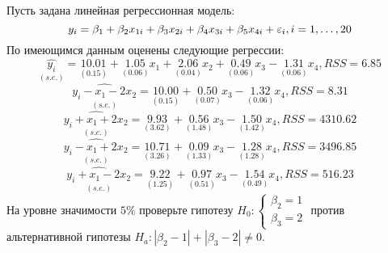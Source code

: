 \documentclass[pdftex,11pt,openany]{book}\usepackage[]{graphicx}\usepackage[]{color}
\begin{document}
\begin{problem}
 Пусть задана линейная регрессионная модель:
\[
y_i = \beta_1 + \beta_2 x_{1i} + \beta_3 x_{2i} + \beta_4 x_{3i} + \beta_5 x_{4i} + \varepsilon_i, i = 1, \dots, 20
\]
По имеющимся данным оценены следующие регрессии:
\[
\underset{(s.e.)}{\hat{y_i}} = \underset{(0.15)}{10.01} + \underset{(0.06)}{1.05}x_1 + \underset{(0.04)}{2.06}x_2 + \underset{(0.06)}{0.49}x_3 - \underset{(0.06)}{1.31}x_4, RSS = 6.85
\]
\[
\underset{(s.e.)}{\widehat{y_i- x_1 - 2x_2}} = \underset{(0.15)}{10.00} + \underset{(0.07)}{0.50}x_3 - \underset{(0.06)}{1.32}x_4, RSS = 8.31 
\]
\[
\underset{(s.e.)}{\widehat{y_i + x_1 + 2x_2}} = \underset{(3.62)}{9.93} + \underset{(1.48)}{0.56}x_3 - \underset{(1.42)}{1.50}x_4, RSS = 4310.62 
\]
\[
\underset{(s.e.)}{\widehat{y_i - x_1 + 2x_2}} = \underset{(3.26)}{10.71} + \underset{(1.33)}{0.09}x_3 - \underset{(1.28)}{1.28}x_4, RSS = 3496.85
\]
\[
\underset{(s.e.)}{\widehat{y_i + x_1 - 2x_2}} = \underset{(1.25)}{9.22} + \underset{(0.51)}{0.97}x_3 - \underset{(0.49)}{1.54}x_4, RSS = 516.23
\]
На уровне значимости $5\%$ проверьте гипотезу $H_0: \begin{cases} \beta_2 = 1 \\ \beta_3 = 2 \end{cases}$ против альтернативной гипотезы $H_a: |\beta_2 - 1| + |\beta_3 - 2| \not= 0$.
\end{problem}

\begin{solution}
\end{solution}
\end{document}
